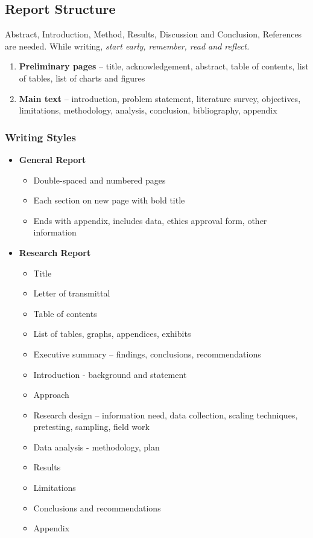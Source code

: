\documentclass{article}
\begin{document}
\subsection{Report Structure}

Abstract, Introduction, Method, Results, Discussion and Conclusion, References are needed. While writing, \textit{start early, remember, read and reflect.}

\begin{enumerate}
    \item \textbf{Preliminary pages} -- title, acknowledgement, abstract, table of contents, list of tables, list of charts and figures
    \item \textbf{Main text} -- introduction, problem statement, literature survey, objectives, limitations, methodology, analysis, conclusion, bibliography, appendix
\end{enumerate}

\subsubsection{Writing Styles}

\begin{itemize}
    \item \textbf{General Report}
    \begin{itemize}
        \item Double-spaced and numbered pages
        \item Each section on new page with bold title
        \item Ends with appendix, includes data, ethics approval form, other information
    \end{itemize}
    \item \textbf{Research Report}
    \begin{itemize}
        \item Title
        \item Letter of transmittal
        \item Table of contents
        \item List of tables, graphs, appendices, exhibits
        \item Executive summary -- findings, conclusions, recommendations
        \item Introduction - background and statement
        \item Approach
        \item Research design -- information need, data collection, scaling techniques, pretesting, sampling, field work
        \item Data analysis - methodology, plan
        \item Results
        \item Limitations
        \item Conclusions and recommendations
        \item Appendix
    \end{itemize}
\end{itemize}
\end{document}
